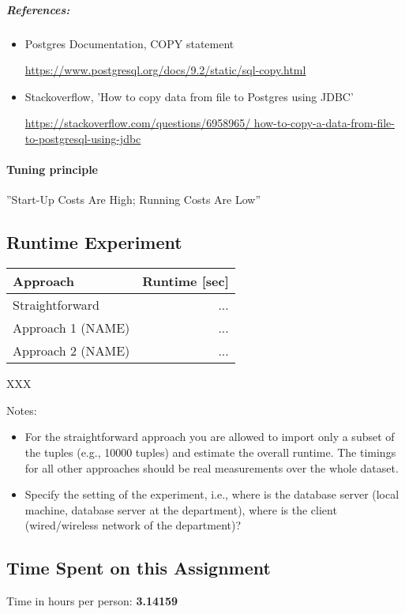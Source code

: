 \documentclass[11pt]{scrartcl}
\begin{document}
  
  \subparagraph{References:}
  
  \begin{itemize}
  
  \item{Postgres Documentation, COPY statement}
  
  \url{https://www.postgresql.org/docs/9.2/static/sql-copy.html}
  
  \item{Stackoverflow, 'How to copy data from file to Postgres using JDBC'}
  
  \url{https://stackoverflow.com/questions/6958965/
  how-to-copy-a-data-from-file-to-postgresql-using-jdbc}
  
  \end{itemize}

  \paragraph{Tuning principle}
  
  ''Start-Up Costs Are High; Running Costs Are Low''

  \subsection*{Runtime Experiment}

  \begin{table}[H]
  \begin{tabular}{l|r}
    Approach & Runtime [sec] \\
    \hline
    Straightforward & ... \\
    Approach 1 (NAME) & ... \\
    Approach 2 (NAME) & ...     
  \end{tabular}
  \end{table}XXX

  \bigskip

  \noindent Notes:
  \begin{itemize}
  \item For the straightforward approach you are allowed to import
    only a subset of the tuples (e.g., 10000 tuples) and estimate the
    overall runtime. The timings for all other approaches should be
    real measurements over the whole dataset.
  \item Specify the setting of the experiment, i.e., where is the
    database server (local machine, database server at the
    department), where is the client (wired/wireless network of the
    department)?
\end{itemize}

  \subsection*{Time Spent on this Assignment}

  Time in hours per person: {\bf 3.14159}
\end{document}
